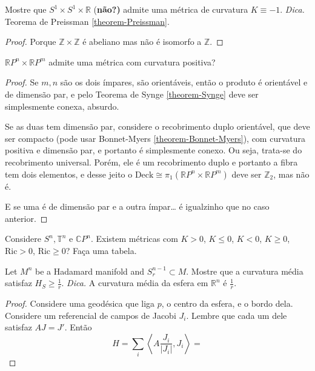 \begin{exercise}
\label{exercise-S1xS1xR-admite-curvatura--1}
Mostre que $S^1 \times S^1 \times \mathbb{R}$ {(\bf não?)} admite uma métrica de
 curvatura $K\equiv-1$. {\it Dica.} Teorema de Preissman 
\ref{theorem-Preissman}.
\end{exercise}

\begin{proof}
Porque $\mathbb{Z} \times \mathbb{Z}$ é abeliano mas não é isomorfo a
$\mathbb{Z}$.
\end{proof}

\begin{exercise}
\label{exercise-RPnxRPm-admite-curvatura-positiva}
$\mathbb{R}P^{n}\times \mathbb{R}P^{m}$ admite uma métrica com 
curvatura positiva?
\end{exercise}

\begin{proof}
Se $m,n$ são os dois ímpares, são orientáveis, então o produto é orientável e de
dimensão par, e pelo Teorema de Synge \ref{theorem-Synge} deve ser
simplesmente conexa, absurdo.
 
Se as duas tem dimensão par, considere o recobrimento duplo orientável, que deve
ser compacto (pode usar Bonnet-Myers \ref{theorem-Bonnet-Myers}), com curvatura
positiva e dimensão par, e portanto é simplesmente conexo. Ou seja, trata-se do
recobrimento universal. Porém, ele é um recobrimento duplo e portanto a fibra
tem dois elementos, e desse jeito o $\text{Deck}\cong
\pi_{1}(\mathbb{R}P^{n}\times\mathbb{R}P^{m})$ deve ser $\mathbb{Z}_2$, 
mas não é.

E se uma é de dimensão par e a outra ímpar… é igualzinho que no caso anterior.
\end{proof}

\begin{exercise}
\label{exercise-Sn-Tn-CPn-existem-curvaturas}
Considere $S^n,\mathbb{T}^n$ e $\mathbb{C}P^{n}$. Existem métricas com $K>0$, $K
\leq 0$, $K<0$, $K \geq 0$, $\text{Ric}>0$, $\text{Ric} \geq 0$? Faça uma
tabela.
\end{exercise}

\begin{exercise}
\label{exercise-Hadamard-manifold-sphere}
Let $M^n$ be a Hadamard manifold and $S^{n-1}_r \subset M$. Mostre que
 a curvatura média satisfaz $H_S\geq \frac{1}{r}$. {\it Dica.} A curvatura média
da esfera em $\mathbb{R}^n$ é $\frac{1}{r}$.
\end{exercise}

\begin{proof}
Considere uma geodésica que liga $p$, o centro da esfera, e o bordo dela.
Considere um referencial de campos de Jacobi $J_i$. Lembre que cada um dele
satisfaz $A J=J'$. Então
$$
H=\sum_{i}\left<A \frac{J_i}{|J_i|},J_i\right>=
$$
\end{proof}

